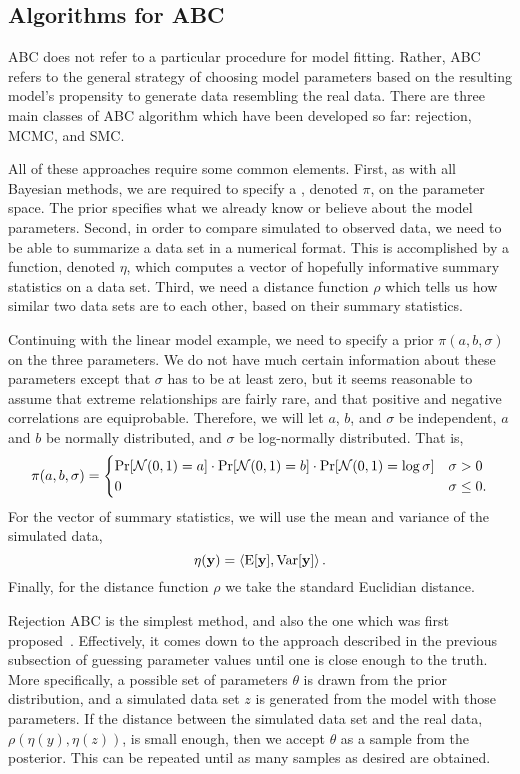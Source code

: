 \subsection{Algorithms for ABC}
\label{subsubsec:abcalg}

\Gls{ABC} does not refer to a particular procedure for model fitting. Rather,
\gls{ABC} refers to the general strategy of choosing model parameters based on
the resulting model's propensity to generate data resembling the real data.
There are three main classes of \gls{ABC} algorithm which have been developed
so far: rejection, \gls{MCMC}, and \gls{SMC}.

All of these approaches require some common elements. First, as with all
Bayesian methods, we are required to specify a ,
denoted $\pi$, on the parameter space. The prior specifies what we already know
or believe about the model parameters. Second, in order to compare simulated to
observed data, we need to be able to summarize a data set in a numerical
format. This is accomplished by a function, denoted $\eta$, which computes a
vector of hopefully informative summary statistics on a data set. Third, we
need a distance function $\rho$ which tells us how similar two data sets are to
each other, based on their summary statistics.

Continuing with the linear model example, we need to specify a prior $\pi(a, b,
\sigma)$ on the three parameters. We do not have much certain information about
these parameters except that $\sigma$ has to be at least zero, but it seems
reasonable to assume that extreme relationships are fairly rare, and that
positive and negative correlations are equiprobable. Therefore, we will let
$a$, $b$, and $\sigma$ be independent, $a$ and $b$ be normally distributed,
and $\sigma$ be log-normally distributed. That is,
\[
  \pi(a, b, \sigma) = 
  \begin{cases}
    \Pr[\mathcal{N}(0, 1) = a] \cdot \Pr[\mathcal{N}(0, 1) = b] \cdot \Pr[\mathcal{N}(0, 1) = \log\sigma]
     & \sigma > 0 \\
    0 & \sigma \le 0.
  \end{cases}
\]
For the vector of summary statistics, we will use the mean and variance of the
simulated data,
\[
  \eta(\mathbf{y}) = \left<\operatorname{E}[\mathbf{y}], \operatorname{Var}[\mathbf{y}]\right>.
\]
Finally, for the distance function $\rho$ we take the standard Euclidian
distance.

Rejection ABC is the simplest method, and also the one which was first
proposed~\autocite{rubin1984bayesianly}. Effectively, it comes down to the
approach described in the previous subsection of guessing parameter values
until one is close enough to the truth. More specifically, a possible set of
parameters $\theta$ is drawn from the prior distribution, and a simulated data
set $z$ is generated from the model with those parameters. If the distance
between the simulated data set and the real data, $\rho(\eta(y), \eta(z))$, is
small enough, then we accept $\theta$ as a sample from the posterior. This can
be repeated until as many samples as desired are obtained.

